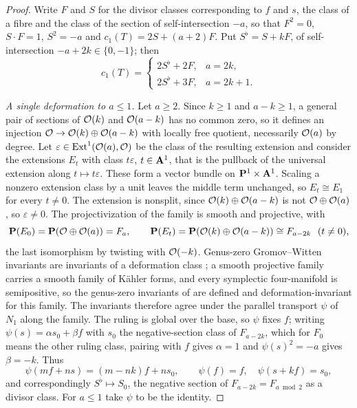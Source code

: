 \begin{proof}
Write \(F\) and \(S\) for the divisor classes corresponding to \(f\) and
\(s\), the class of a fibre and the class of the section of self-intersection
\(-a\), so that \(F^2=0\), \(S\cdot F=1\), \(S^2=-a\) and
\(c_1(T)=2S+(a+2)F\).  Put \(S^\flat=S+kF\), of self-intersection
\(-a+2k\in\{0,-1\}\); then
\[
 c_1(T)=
 \begin{cases}
  2S^\flat+2F, & a=2k,\\
  2S^\flat+3F, & a=2k+1.
 \end{cases}
\]

\emph{A single deformation to \(a\le1\).}  Let \(a\ge2\).  Since
\(k\ge1\) and
\(a-k\ge1\), a general pair of sections of \(\mathcal O(k)\) and \(\mathcal O(a-k)\) has no
common zero, so it defines an injection \(\mathcal O\to\mathcal O(k)\oplus\mathcal O(a-k)\) with
locally free quotient, necessarily \(\mathcal O(a)\) by degree.  Let
\(\varepsilon\in\operatorname{Ext}^1(\mathcal O(a),\mathcal O)\) be the class of the
resulting extension and consider the extensions \(E_t\) with class
\(t\varepsilon\), \(t\in\mathbf A^1\), that is the pullback of the universal
extension along \(t\mapsto t\varepsilon\).  These form a vector bundle on
\(\mathbf P^1\times\mathbf A^1\).  Scaling a nonzero extension class by a unit leaves the
middle term unchanged, so \(E_t\cong E_1\) for every \(t\ne0\).  The
extension is nonsplit, since \(\mathcal O(k)\oplus\mathcal O(a-k)\) is not
\(\mathcal O\oplus\mathcal O(a)\), so \(\varepsilon\ne0\).  The projectivization of the
family is smooth and projective, with
\[
 \mathbf P(E_0)=\mathbf P(\mathcal O\oplus\mathcal O(a))=F_a,
 \qquad
 \mathbf P(E_t)=\mathbf P(\mathcal O(k)\oplus\mathcal O(a-k))\cong F_{a-2k}\ \ (t\ne0),
\]
the last isomorphism by twisting with \(\mathcal O(-k)\).  Genus-zero Gromov--Witten
invariants are invariants of a deformation class
\cite[Chapter~7]{McDuffSalamon}; a smooth projective family carries a smooth
family of Kähler forms, and every symplectic four-manifold is semipositive, so
the genus-zero invariants of \cite{McDuffSalamon} are defined and
deformation-invariant for this family.  The invariants therefore agree under
the parallel
transport \(\psi\) of \(N_1\) along the family.  The ruling is global over the
base, so \(\psi\) fixes \(f\); writing \(\psi(s)=\alpha s_0+\beta f\) with
\(s_0\) the negative-section class of \(F_{a-2k}\), which for \(F_0\) means
the other ruling class, pairing with \(f\) gives
\(\alpha=1\) and \(\psi(s)^2=-a\) gives \(\beta=-k\).  Thus
\[
 \psi(mf+ns)=(m-nk)f+ns_0,
 \qquad
 \psi(f)=f,\quad \psi(s+kf)=s_0,
\]
and correspondingly \(S^\flat\mapsto S_0\), the negative section of
\(F_{a-2k}=F_{a\bmod2}\) as a divisor class.  For \(a\le1\) take \(\psi\) to
be the identity.


\end{proof}
